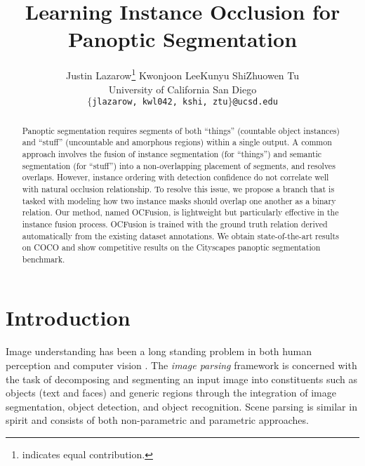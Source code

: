 \documentclass[10pt,twocolumn,letterpaper]{article}
\begin{document}
\title{Learning Instance Occlusion for Panoptic Segmentation}

\author{Justin Lazarow\thanks{ \:indicates equal contribution.} \quad Kwonjoon Lee\footnotemark[1] \quad Kunyu Shi\footnotemark[1] \quad Zhuowen Tu\\
University of California San Diego\\
{\tt\small $\{$jlazarow, kwl042, kshi, ztu$\}$@ucsd.edu}
}

\maketitle
\thispagestyle{empty}

\begin{abstract}
  Panoptic segmentation requires segments of both ``things'' (countable object instances) and  ``stuff'' (uncountable and amorphous regions) within a single output. A common approach involves the fusion of instance segmentation (for ``things'') and semantic segmentation (for ``stuff'') into a non-overlapping placement of segments, and resolves overlaps.
  However, instance ordering with detection confidence do not correlate well with natural occlusion relationship.
  To resolve this issue, we propose a branch that is tasked with modeling how two instance masks should overlap one another as a binary relation. Our method, named OCFusion, is lightweight but particularly effective in the instance fusion process. OCFusion is trained with the ground truth relation derived automatically from the existing dataset annotations. We obtain state-of-the-art results on COCO and show competitive results on the Cityscapes panoptic segmentation benchmark.
\end{abstract}


\vspace{-5mm}
\section{Introduction}
Image understanding has been a long standing problem in both human perception \cite{biederman1987recognition} and computer vision \cite{marr1982vision}. The {\em image parsing} framework \cite{tu2005image} is concerned with the task of decomposing and segmenting an input image into constituents such as objects (text and faces) and generic regions through the integration of image segmentation, object detection, and object recognition. Scene parsing is similar in spirit and consists of both non-parametric \cite{tighe2014scene} and parametric \cite{zhao2016pspnet} approaches.
\end{document}
